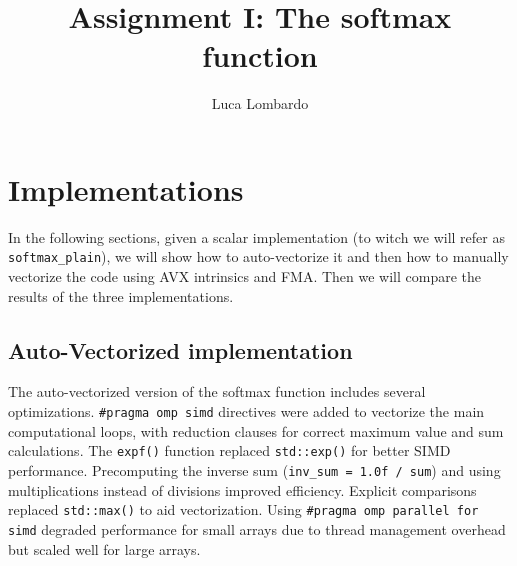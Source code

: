 \documentclass[10pt]{article}
\title{Assignment I: The softmax function}
\author{Luca Lombardo}
\date{}
\newcommand{\R}{\mathbb{R}}
\begin{document}
\maketitle

\tableofcontents

\setlength{\parindent}{0em}



\section{Implementations}
In the following sections, given a scalar implementation (to witch we will refer as \texttt{softmax\_plain}), we will show how to auto-vectorize it and then how to manually vectorize the code using AVX intrinsics and FMA. Then we will compare the results of the three implementations.

\subsection{Auto-Vectorized implementation}
The auto-vectorized version of the softmax function includes several optimizations. \texttt{\#pragma omp simd} directives were added to vectorize the main computational loops, with reduction clauses for correct maximum value and sum calculations. The \texttt{expf()} function replaced \texttt{std::exp()} for better SIMD performance. Precomputing the inverse sum (\texttt{inv\_sum = 1.0f / sum}) and using multiplications instead of divisions improved efficiency. Explicit comparisons replaced \texttt{std::max()} to aid vectorization. Using \texttt{\#pragma omp parallel for simd} degraded performance for small arrays due to thread management overhead but scaled well for large arrays.
\end{document}
